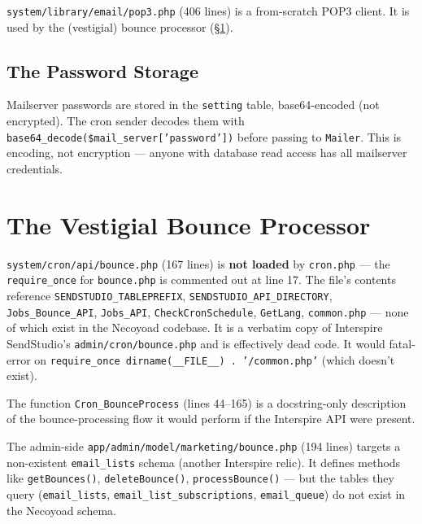 \documentclass[11pt,a4paper]{article}
\begin{document}
\texttt{system/library/email/pop3.php} (406 lines) is a
from-scratch POP3 client. It is used by the (vestigial) bounce
processor (\S\ref{sec:bounce}).

\subsection{The Password Storage}

Mailserver passwords are stored in the \texttt{setting} table,
base64-encoded (not encrypted). The cron sender decodes them with
\texttt{base64\_decode(\$mail\_server['password'])} before passing
to \texttt{Mailer}. This is encoding, not encryption --- anyone
with database read access has all mailserver credentials.

\section{The Vestigial Bounce Processor}\label{sec:bounce}

\begin{findingbox}
\texttt{system/cron/api/bounce.php} (167 lines) is \textbf{not
loaded} by \texttt{cron.php} --- the \texttt{require\_once} for
\texttt{bounce.php} is commented out at line 17. The file's
contents reference \texttt{SENDSTUDIO\_TABLEPREFIX},
\texttt{SENDSTUDIO\_API\_DIRECTORY}, \texttt{Jobs\_Bounce\_API},
\texttt{Jobs\_API}, \texttt{CheckCronSchedule}, \texttt{GetLang},
\texttt{common.php} --- none of which exist in the Necoyoad
codebase. It is a verbatim copy of Interspire SendStudio's
\texttt{admin/cron/bounce.php} and is effectively dead code. It
would fatal-error on \texttt{require\_once dirname(\_\_FILE\_\_) .
'/common.php'} (which doesn't exist).

The function \texttt{Cron\_BounceProcess} (lines 44--165) is a
docstring-only description of the bounce-processing flow it
would perform if the Interspire API were present.
\end{findingbox}

The admin-side \texttt{app/admin/model/marketing/bounce.php}
(194 lines) targets a non-existent \texttt{email\_lists} schema
(another Interspire relic). It defines methods like
\texttt{getBounces()}, \texttt{deleteBounce()},
\texttt{processBounce()} --- but the tables they query
(\texttt{email\_lists}, \texttt{email\_list\_subscriptions},
\texttt{email\_queue}) do not exist in the Necoyoad schema.
\end{document}
